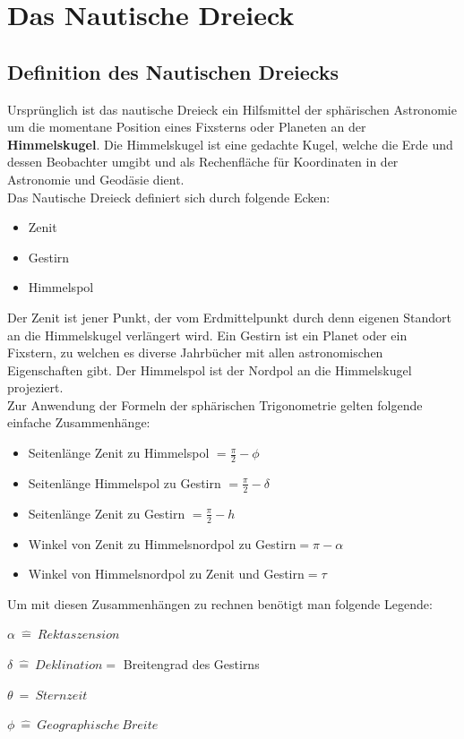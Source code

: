 \documentclass[12pt]{scrartcl}
\begin{document}
	\setlength{\parindent}{0em}
\section{Das Nautische Dreieck}
\subsection{Definition des Nautischen Dreiecks}
Ursprünglich ist das nautische Dreieck ein Hilfsmittel der sphärischen Astronomie um die momentane Position eines Fixsterns oder Planeten an der \textbf{Himmelskugel}. 
Die Himmelskugel ist eine gedachte Kugel, welche die Erde und dessen Beobachter umgibt und als Rechenfläche für Koordinaten in der Astronomie und Geodäsie dient.\\
Das Nautische Dreieck definiert sich durch folgende Ecken:
\begin{itemize}
	\item Zenit 
	\item Gestirn
	\item Himmelspol
\end{itemize}
Der Zenit ist jener Punkt, der vom Erdmittelpunkt durch denn eigenen Standort an die Himmelskugel verlängert wird.
Ein Gestirn ist ein Planet oder ein Fixstern, zu welchen es diverse Jahrbücher mit allen astronomischen Eigenschaften gibt. 
Der Himmelspol ist der Nordpol an die Himmelskugel projeziert.
\\
Zur Anwendung der Formeln der sphärischen Trigonometrie gelten folgende einfache Zusammenhänge:
\begin{itemize}
	\item Seitenlänge Zenit zu Himmelspol $= \frac{\pi}{2} - \phi $
	\item Seitenlänge Himmelspol zu Gestirn $= \frac{\pi}{2} - \delta$
	\item Seitenlänge Zenit zu Gestirn $= \frac{\pi}{2} - h$
	\item Winkel von Zenit zu Himmelsnordpol zu Gestirn$=\pi - \alpha$
	\item Winkel von Himmelsnordpol zu Zenit und Gestirn$= \tau$
\end{itemize}
Um mit diesen Zusammenhängen zu rechnen benötigt man folgende Legende:

$\alpha \ \widehat{=} \ Rektaszension $

$\delta \ \widehat{=} \ Deklination =$ Breitengrad des Gestirns 

$\theta \ \widehat{=} \ Sternzeit$

$\phi \ \widehat{=} \ Geographische \ Breite $
\end{document}
